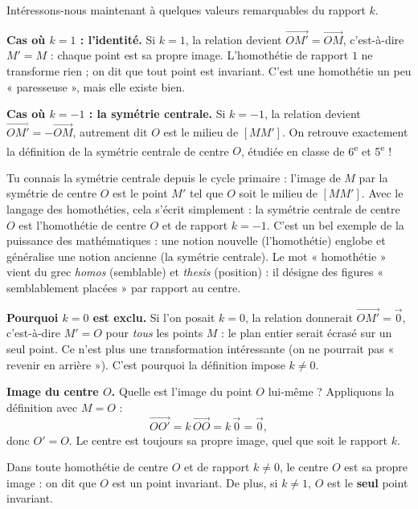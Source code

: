 \documentclass[11pt]{article}
\newcommand{\cle}[1]{{\popxbold\color{popdark}#1}}
\newcounter{popsec}
\newcounter{popsub}
\newcommand{\courssub}[1]{%
  \stepcounter{popsub}%
  \par\vspace{9pt}\noindent{\popxbold\fontsize{11.5}{13}\selectfont\color{popink}{\color{poporange}\thepopsec.\thepopsub}\hspace{6pt}#1}\par\nopagebreak\vspace{4pt}
}
\begin{document}
\courssub{Cas particuliers et image du centre}

Intéressons-nous maintenant à quelques valeurs remarquables du rapport $k$.

\textbf{Cas où $k = 1$ : l'identité.} Si $k = 1$, la relation devient $\overrightarrow{OM'} = \overrightarrow{OM}$, c'est-à-dire $M' = M$ : chaque point est sa propre image. L'homothétie de rapport $1$ ne transforme rien ; on dit que tout point est \cle{invariant}. C'est une homothétie un peu « paresseuse », mais elle existe bien.

\textbf{Cas où $k = -1$ : la symétrie centrale.} Si $k = -1$, la relation devient $\overrightarrow{OM'} = -\overrightarrow{OM}$, autrement dit $O$ est le milieu de $[MM']$. On retrouve exactement la définition de la \cle{symétrie centrale} de centre $O$, étudiée en classe de 6\textsuperscript{e} et 5\textsuperscript{e} !

\begin{savaistu}
Tu connais la symétrie centrale depuis le cycle primaire : l'image de $M$ par la symétrie de centre $O$ est le point $M'$ tel que $O$ soit le milieu de $[MM']$. Avec le langage des homothéties, cela s'écrit simplement : la symétrie centrale de centre $O$ est l'homothétie de centre $O$ et de rapport $k = -1$. C'est un bel exemple de la puissance des mathématiques : une notion nouvelle (l'homothétie) englobe et généralise une notion ancienne (la symétrie centrale). Le mot « homothétie » vient du grec \emph{homos} (semblable) et \emph{thesis} (position) : il désigne des figures « semblablement placées » par rapport au centre.
\end{savaistu}

\textbf{Pourquoi $k = 0$ est exclu.} Si l'on posait $k = 0$, la relation donnerait $\overrightarrow{OM'} = \vec{0}$, c'est-à-dire $M' = O$ pour \emph{tous} les points $M$ : le plan entier serait écrasé sur un seul point. Ce n'est plus une transformation intéressante (on ne pourrait pas « revenir en arrière »). C'est pourquoi la définition impose $k \neq 0$.

\textbf{Image du centre $O$.} Quelle est l'image du point $O$ lui-même ? Appliquons la définition avec $M = O$ :
\[ \overrightarrow{OO'} = k\,\overrightarrow{OO} = k\,\vec{0} = \vec{0}, \]
donc $O' = O$. Le centre est toujours sa propre image, quel que soit le rapport $k$.

\begin{propriete}
Dans toute homothétie de centre $O$ et de rapport $k \neq 0$, le centre $O$ est sa propre image : on dit que $O$ est un point \cle{invariant}. De plus, si $k \neq 1$, $O$ est le \textbf{seul} point invariant.
\end{propriete}
\end{document}
